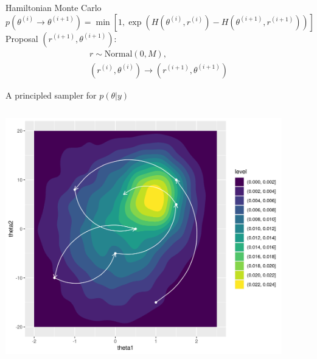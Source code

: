 \documentclass[bigger]{beamer}
\begin{document}
\begin{frame}[label={sec:org0a478d4}]{Hamiltonian Monte Carlo}
\begin{equation*}
  p(\theta^{(i)} \rightarrow \theta^{(i+1)}) =\min\left[
    1, \exp{(H(\theta^{(i)}, r^{(i)}) - H(\theta^{(i+1)}, r^{(i+1)}))}
  \right]
\end{equation*}
Proposal \((r^{(i+1)}, \theta^{(i+1)})\):
\begin{align*}
  r \sim \text{Normal}(0, M),\\
  (r^{(i)}, \theta^{(i)}) \rightarrow (r^{(i+1)}, \theta^{(i+1)})
\end{align*}
\end{frame}


\begin{frame}[label={sec:orgb1c3ccd}]{A principled sampler for \(p(\theta|y)\)}
\begin{columns}
\begin{column}{0.8\columnwidth}
\begin{center}
\includegraphics[width=0.9\textwidth]{./figure/sampler_path.png}
\end{center}
\end{column}


\end{columns}
\end{frame}
\end{document}
